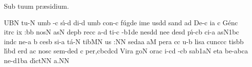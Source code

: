 
\beginhymn Sub tuum pr\ae sidium.

\Internote
\nosolesmescustos
\initiumgregorianum
{}%
\sgn {}UB\punctum N\egn
\spatium
\sgn tu-\punctum N\egn
\sgn {}um\punctum b\egn
\spatium
{}-\punctum c\egn
\sgn s{\'\i}-\punctum d\egn
\sgn d{i}-\punctum d\egn
\sgn {}um\punctum b\egn
\spatium
\sgn co{n-}\punctum c\egn
\sgn f{\'u}g\pes de\egn
\sgn {}im\punctum e\egn
\sgn {}us\punctum d\augmentum d\egn
\spatium
\divisiominima
\spatium
\sgn san\punctum d\egn
{}a{}\punctum d\egn
\spatium
\sgn De-\punctum c\egn
\sgn {}i{}\punctum a\egn
\custos c
\lineaproxima
\sgn G{\'e}n\punctum c\egn
\sgn {}i{tr}\punctum c\egn
\sgn {}i{x :}\punctum b\augmentum b\egn
\spatium
\divisiominor
\spatium
\sgn nos\punctum N\egn
{}as\punctum N\egn
\spatium
\sgn dep\punctum b\egn
\sgn rec\punctum c\egn
\sgn {}a-\punctum d\egn
\sgn ti-\punctum c\egn
{}-\episem b1\pes de\egn
\sgn nes\punctum d\augmentum d\egn
\spatium
\divisiominima
\spatium
\sgn ne{}\punctum e\egn
\spatium
\sgn des\punctum d\egn
\sgn p{\'\i}-\clivis cb\egn
\sgn ci-\punctum a\egn
\sgn {}as\episem N1\pes bc\egn
\spatium
\sgn {}in\cephalicus dc\egn
\spatium
\sgn ne{-}\punctum a\egn
\spatium
\custos b
\lineaproxima
\sgn ces\punctum b\egn
\sgn si-\punctum a\egn
\sgn t{\'a}-\punctum N\egn
\sgn tib\pes MN\egn
\sgn {}u{s :}\punctum N\augmentum N\egn
\spatium
\divisiomaior
\spatium
\sgn sed\punctum a\spatiumparvum\punctum a\egn
\spatium
\sgn {}a{}\punctum M\egn
\spatium
\sgn per\punctum a\egn
\sgn {}{\'\i}c\punctum c\egn
\sgn {}u-\punctum b\egn
\sgn lis\punctum a\egn
\spatium
\sgn cu{nc}\punctum c\spatiumparvum\punctum c\egn
\sgn tis\punctum b\augmentum b\egn
\spatium
\divisiominima
\spatium
\sgn l{\'\i}b\punctum d\egn
\sgn {}er\punctum d\egn
\sgn {}a{}\punctum c\egn
\spatium
\sgn nos\punctum c\egn
\spatium
\sgn se{m-}\torculus ded\egn
\custos c
\lineaproxima
\sgn pe{r,}\clivis cb\spatiumparvum\torculus cdc\augmentum d\egn
\spatium
\divisiominor
\spatium
\sgn Vir\punctum a\egn
\sgn go{}\punctum N\egn
\spatium
{}or\pes ac\egn
\sgn {}i-\pes cd\egn
{}-\clivis cb\egn
\sgn sa{}\episem b1\clivis aN\egn
\spatium
\divisiominima
\spatium
\sgn {}et\punctum a\egn
\spatium
\sgn be-\punctum a\nonspatium{}\quilismatorculus bca\egn
\sgn ne-\episem d1\clivis ba\egn
\sgn d{\'\i}{ct}\punctum N\augmentum N\egn
\sgn {}a.\punctum N\augmentum N\egn
\spatium
\Finisgregoriana
